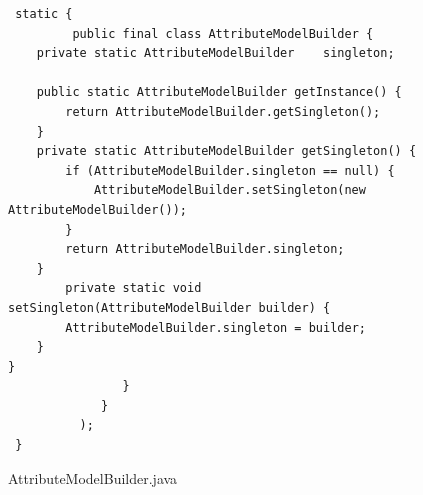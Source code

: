


\begin{figure}[!tbp]
\centering
\lstset{language=Java, stepnumber=1, showspaces=false, showstringspaces=false,breaklines=true}
\begin{lstlisting}
 static {
         public final class AttributeModelBuilder {
	private static AttributeModelBuilder	singleton;

	public static AttributeModelBuilder getInstance() {
		return AttributeModelBuilder.getSingleton();
	}
	private static AttributeModelBuilder getSingleton() {
		if (AttributeModelBuilder.singleton == null) {
			AttributeModelBuilder.setSingleton(new AttributeModelBuilder());
		}
		return AttributeModelBuilder.singleton;
	}
		private static void setSingleton(AttributeModelBuilder builder) {
		AttributeModelBuilder.singleton = builder;
	}
}
                }
             }
          );
 }
\end{lstlisting}
\caption{AttributeModelBuilder.java}
\label{AttributeModelBuilder}
\end{figure}